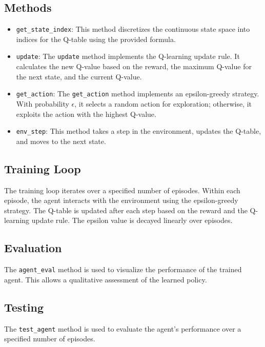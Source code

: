 \documentclass{article}
\begin{document}
\subsection{Methods}
\begin{itemize}
    \item \texttt{get\_state\_index}: This method discretizes the continuous state space into indices for the Q-table using 
    the provided formula.
    \item \texttt{update}: The \texttt{update} method implements the Q-learning update rule. It calculates the new Q-value 
    based on the reward, the maximum Q-value for the next state, and the current Q-value.
    \item \texttt{get\_action}: The \texttt{get\_action} method implements an epsilon-greedy strategy. With probability 
    \(\epsilon\), it selects a random action for exploration; otherwise, it exploits the action with the highest Q-value.
    \item \texttt{env\_step}: This method takes a step in the environment, updates the Q-table, and moves to the next state.
\end{itemize}

\subsection{Training Loop}
The training loop iterates over a specified number of episodes. Within each episode, the agent interacts with the environment 
using the epsilon-greedy strategy. The Q-table is updated after each step based on the reward and the Q-learning update rule. 
The epsilon value is decayed linearly over episodes.

\subsection{Evaluation}
The \texttt{agent\_eval} method is used to visualize the performance of the trained agent. This allows a qualitative 
assessment of the learned policy.

\subsection{Testing}
The \texttt{test\_agent} method is used to evaluate the agent's performance over a specified number of episodes.

\end{document}
